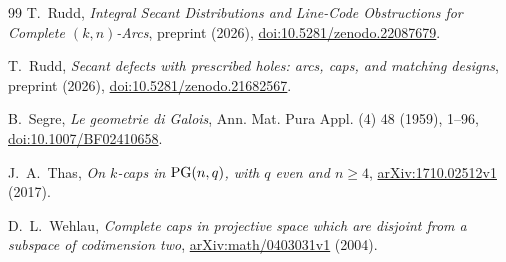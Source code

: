 \begin{thebibliography}{99}
T.~Rudd,
\emph{Integral Secant Distributions and Line-Code Obstructions for
Complete \((k,n)\)-Arcs}, preprint (2026),
\href{https://doi.org/10.5281/zenodo.22087679}{doi:10.5281/zenodo.22087679}.

T.~Rudd,
\emph{Secant defects with prescribed holes: arcs, caps, and matching
designs}, preprint (2026),
\href{https://doi.org/10.5281/zenodo.21682567}{doi:10.5281/zenodo.21682567}.

B.~Segre,
\emph{Le geometrie di Galois}, Ann. Mat. Pura Appl. (4) 48 (1959), 1--96,
\href{https://doi.org/10.1007/BF02410658}{doi:10.1007/BF02410658}.

J.~A.~Thas,
\emph{On \(k\)-caps in \(\mathrm{PG}(n,q)\), with \(q\) even and \(n\ge4\)},
\href{https://arxiv.org/abs/1710.02512}{arXiv:1710.02512v1} (2017).

D.~L.~Wehlau,
\emph{Complete caps in projective space which are disjoint from a
subspace of codimension two},
\href{https://arxiv.org/abs/math/0403031}{arXiv:math/0403031v1} (2004).

\end{thebibliography}
